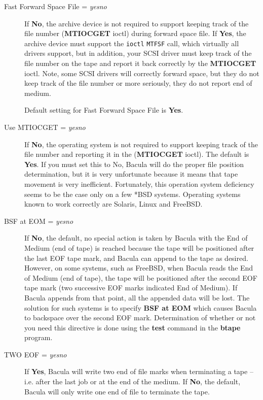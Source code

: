 \begin{description}
\item [Fast Forward Space File = {\it yes\vb{}no}]
   If {\bf No}, the archive device is not required to support  keeping track of
   the file number ({\bf MTIOCGET} ioctl) during  forward space file. If {\bf
   Yes}, the archive device must support  the {\tt ioctl} {\tt MTFSF} call, which
   virtually all drivers  support, but in addition, your SCSI driver must keep
   track of the  file number on the tape and report it back correctly by the 
   {\bf MTIOCGET} ioctl. Note, some SCSI drivers will correctly  forward space,
   but they do not keep track of the file number or more  seriously, they do not
   report end of medium.  
   
   Default setting for Fast Forward Space File is {\bf Yes}.
   
\item [Use MTIOCGET = {\it yes\vb{}no}]
   If {\bf No}, the operating system is not required to support keeping track of
   the file number and reporting it in the ({\bf MTIOCGET} ioctl). The default
   is {\bf Yes}. If you must set this to No, Bacula will do the proper file
   position determination, but it is very unfortunate because it means that 
   tape movement is very inefficient.
   Fortunately, this operation system deficiency seems to be the case only
   on a few *BSD systems.  Operating systems known to work correctly are
   Solaris, Linux and FreeBSD.

\item [BSF at EOM = {\it yes\vb{}no}]
   If {\bf No}, the default, no special action is taken by Bacula with the End
   of Medium (end of tape) is reached because the tape will be positioned after
   the last EOF tape mark, and Bacula can append to the tape as desired.
   However, on some systems, such as FreeBSD, when Bacula reads the End of
   Medium (end of tape), the tape will be positioned after the second EOF tape
   mark (two successive EOF marks indicated End of Medium). If Bacula appends
   from that point, all the appended data will be lost. The solution for such
   systems is to specify {\bf BSF at EOM} which causes Bacula to backspace over
   the second EOF mark. Determination of whether or not you need this directive
   is done using the {\bf test} command in the {\bf btape} program.

\item [TWO EOF = {\it yes\vb{}no}]
   If {\bf Yes}, Bacula will write two end of file marks when terminating a
   tape -- i.e. after the last job or at the end of the medium. If {\bf No},
   the default, Bacula will only write one end of file to terminate the tape.


\end{description}
